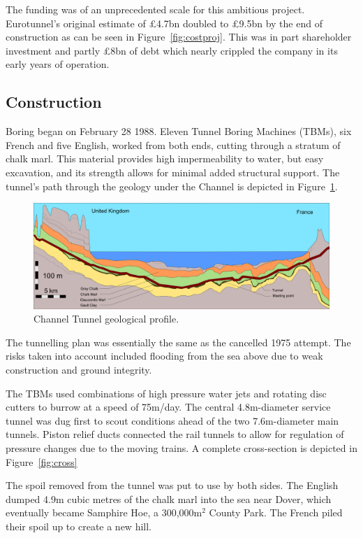 \documentclass[12pt]{article} %
\begin{document}
The funding  was of an unprecedented scale for this ambitious project. Eurotunnel's original estimate of £4.7bn doubled to £9.5bn by the end of construction as can be seen in Figure~\ref{fig:costproj}.\cite{costeval} This was in part shareholder investment and partly £8bn of debt which nearly crippled the company in its early years of operation.

\subsection{Construction}
Boring began on February 28 1988. Eleven Tunnel Boring Machines (TBMs), six French and five English, worked from both ends, cutting through a stratum of chalk marl. This material provides high impermeability to water, but easy excavation, and its strength allows for minimal added structural support. The tunnel's path through the geology under the Channel is depicted in Figure~\ref{fig:geo}.

\begin{figure}[hp]
  \centering
  \includegraphics[width=\textwidth]{geology}
  \caption{Channel Tunnel geological profile.}
  \label{fig:geo}
\end{figure}

The tunnelling plan was essentially the same as the cancelled 1975 attempt. The risks taken into account included flooding from the sea above due to weak construction and ground integrity.

The TBMs used combinations of high pressure water jets and rotating disc cutters to burrow at a speed of 75m/day. The central 4.8m-diameter service tunnel was dug first to scout conditions ahead of the two 7.6m-diameter main tunnels. Piston relief ducts connected the rail tunnels to allow for regulation of pressure changes due to the moving trains. A complete cross-section is depicted in Figure~\ref{fig:cross}

The spoil removed from the tunnel was put to use by both sides. The English dumped 4.9m cubic metres of the chalk marl into the sea near Dover, which eventually became Samphire Hoe, a 300,000m$^2$ County Park.\cite{samphoe} The French piled their spoil up to create a new hill.
\end{document}
